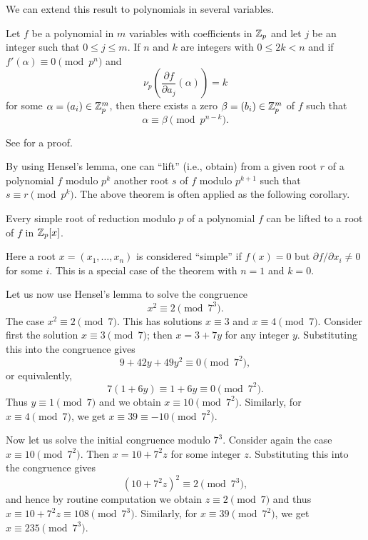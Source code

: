 \medskip

We can extend this result to polynomials in several variables.

\begin{theorem}
    Let \(f\) be a polynomial in \(m\) variables with coefficients in
    \(\mathbb{Z}_p\) and let \(j\) be an integer such that \(0 \leq j \leq m\).
    If \(n\) and \(k\) are integers with \(0 \leq 2k < n\) and if \(f'(\alpha)
    \equiv 0 \pmod{p^n}\) and
    \[
        \nu_p\left(\frac{\partial f}{\partial a_j}(\alpha)\right) = k
    \]
    for some \(\alpha = (a_i) \in \mathbb{Z}_p^m\), then there exists a zero
    \(\beta = (b_i) \in \mathbb{Z}_p^m\) of \(f\) such that
    \[
        \alpha \equiv \beta \pmod{p^{n-k}}.
    \]
\end{theorem}

See \cite[pp.~14--15]{serre2012course} for a proof.

\medskip

By using Hensel's lemma, one can ``lift'' (i.e., obtain) from a given root \(r\)
of a polynomial \(f\) modulo \(p^k\) another root \(s\) of \(f\) modulo
\(p^{k+1}\) such that \(s \equiv r \pmod{p^k}\). The above theorem is often
applied as the following corollary.

\begin{corollary}
    Every simple root of reduction modulo \(p\) of a polynomial \(f\) can be
    lifted to a root of \(f\) in \(\mathbb{Z}_p[x]\).
\end{corollary}

Here a root \(x = (x_1, \dots, x_n)\) is considered ``simple'' if \(f(x) = 0\)
but \(\partial f / \partial x_i \neq 0\) for some \(i\). This is a special case
of the theorem with \(n = 1\) and \(k = 0\).

\smallskip

Let us now use Hensel's lemma to solve the congruence
\[
    x^2 \equiv 2 \pmod{7^3}.  
\]
The case \(x^2 \equiv 2 \pmod{7}\). This has solutions \(x \equiv 3\) and \(x
\equiv 4 \pmod{7}\). Consider first the solution \(x \equiv 3 \pmod{7}\); then
\(x = 3 + 7y\) for any integer \(y\). Substituting this into the congruence
gives
\[
    9 + 42y + 49y^2 \equiv 0 \pmod{7^2},
\]
or equivalently,
\[
    7(1 + 6y) \equiv 1 + 6y \equiv 0 \pmod{7^2}.
\]
Thus \(y \equiv 1 \pmod{7}\) and we obtain \(x \equiv 10 \pmod{7^2}\).
Similarly, for \(x \equiv 4 \pmod{7}\), we get \(x \equiv 39 \equiv -10
\pmod{7^2}\).

Now let us solve the initial congruence modulo \(7^3\). Consider again the case
\(x \equiv 10 \pmod{7^2}\). Then \(x = 10 + 7^2z\) for some integer \(z\).
Substituting this into the congruence gives
\[
    (10+7^2z)^2 \equiv 2 \pmod{7^3},
\]
and hence by routine computation we obtain \(z \equiv 2 \pmod{7}\) and thus \(x
\equiv 10 + 7^2z \equiv 108 \pmod{7^3}\). Similarly, for \(x \equiv 39
\pmod{7^2}\), we get \(x \equiv 235 \pmod{7^3}\).

